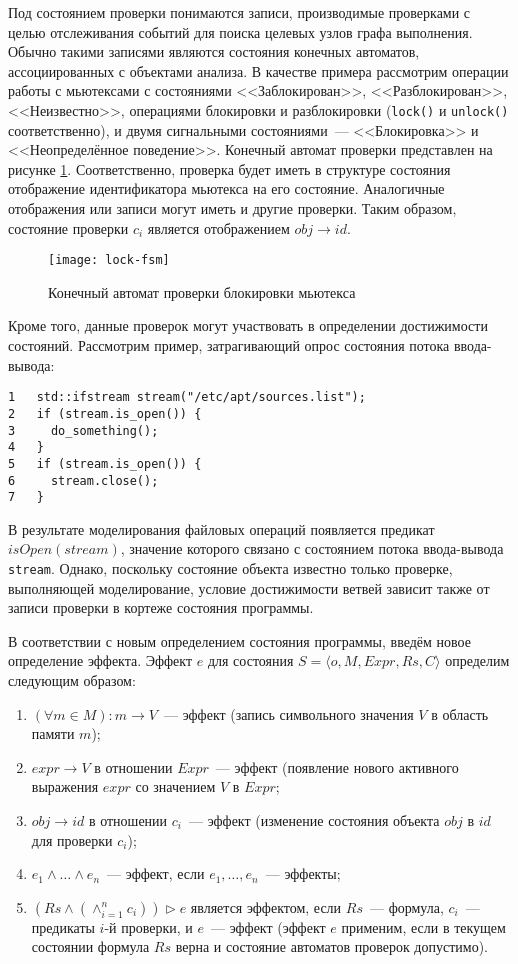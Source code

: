 Под состоянием проверки понимаются записи, производимые проверками с целью отслеживания событий для поиска целевых узлов графа выполнения. Обычно такими записями являются состояния конечных автоматов, ассоциированных с объектами анализа. В качестве примера рассмотрим операции работы с мьютексами с состояниями <<Заблокирован>>, <<Разблокирован>>, <<Неизвестно>>, операциями блокировки и разблокировки (\texttt{lock()} и \texttt{unlock()} соответственно), и двумя сигнальными состояниями~--- <<Блокировка>> и <<Неопределённое поведение>>. Конечный автомат проверки представлен на рисунке \ref{pic:lock-fsm}. Соответственно, проверка будет иметь в структуре состояния отображение идентификатора мьютекса на его состояние. Аналогичные отображения или записи могут иметь и другие проверки. Таким образом, состояние проверки $c_i$ является отображением $obj \rightarrow id$.

\begin{figure}[h]
   \centering
   \texttt{[image: lock-fsm]}
   \caption{Конечный автомат проверки блокировки мьютекса}\label{pic:lock-fsm}
\end{figure}

Кроме того, данные проверок могут участвовать в определении достижимости состояний. Рассмотрим пример, затрагивающий опрос состояния потока ввода-вывода:

\begin{verbatim}
1   std::ifstream stream("/etc/apt/sources.list");
2   if (stream.is_open()) {
3     do_something();
4   }
5   if (stream.is_open()) {
6     stream.close();
7   }
\end{verbatim}

В результате моделирования файловых операций появляется предикат $isOpen(stream)$, значение которого связано с состоянием потока ввода-вывода \texttt{stream}. Однако, поскольку состояние объекта известно только проверке, выполняющей моделирование, условие достижимости ветвей зависит также от записи проверки в кортеже состояния программы.

В соответствии с новым определением состояния программы, введём новое определение эффекта. Эффект $e$ для состояния $S = \langle o, M, Expr, Rs, C \rangle$ определим следующим образом:

\begin{enumerate}
 \item $(\forall m \in M): m \rightarrow V$~--- эффект (запись символьного значения $V$ в область памяти $m$);
 \item $expr \rightarrow V$ в отношении $Expr$~--- эффект (появление нового активного выражения $expr$ со значением $V$ в $Expr$;
 \item $obj \rightarrow id$ в отношении $c_i$~--- эффект (изменение состояния объекта $obj$ в $id$ для проверки $c_i$);
 \item $e_1 \wedge \ldots \wedge e_n$~--- эффект, если $e_1, \ldots, e_n$~--- эффекты;
 \item $(Rs \wedge (\wedge_{i = 1}^n c_i)) \triangleright e$ является эффектом, если $Rs$~--- формула, $c_i$~--- предикаты $i$-й проверки, и $e$~--- эффект (эффект $e$ применим, если в текущем состоянии формула $Rs$ верна и состояние автоматов проверок допустимо).
\end{enumerate}

